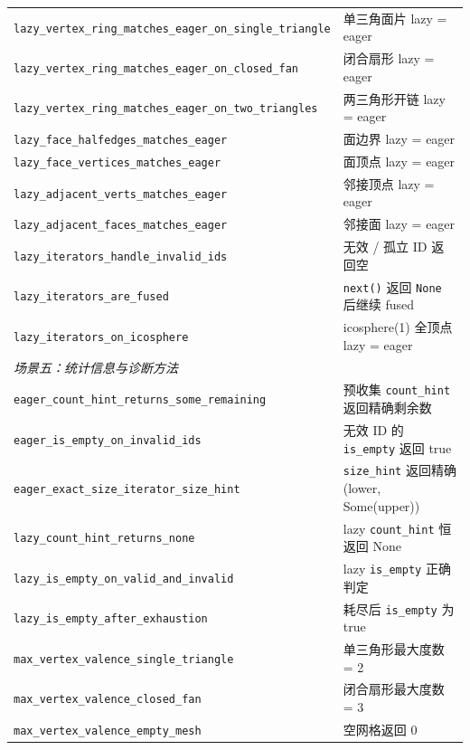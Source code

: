 \documentclass[11pt,a4paper]{article}
\begin{document}
{\begin{longtable}{@{}ll@{}}
  \texttt{lazy\_vertex\_ring\_matches\_eager\_on\_single\_triangle} & 单三角面片 lazy = eager \\
  \texttt{lazy\_vertex\_ring\_matches\_eager\_on\_closed\_fan}      & 闭合扇形 lazy = eager \\
  \texttt{lazy\_vertex\_ring\_matches\_eager\_on\_two\_triangles}   & 两三角形开链 lazy = eager \\
  \texttt{lazy\_face\_halfedges\_matches\_eager}                    & 面边界 lazy = eager \\
  \texttt{lazy\_face\_vertices\_matches\_eager}                     & 面顶点 lazy = eager \\
  \texttt{lazy\_adjacent\_verts\_matches\_eager}                    & 邻接顶点 lazy = eager \\
  \texttt{lazy\_adjacent\_faces\_matches\_eager}                    & 邻接面 lazy = eager \\
  \texttt{lazy\_iterators\_handle\_invalid\_ids}                    & 无效 / 孤立 ID 返回空 \\
  \texttt{lazy\_iterators\_are\_fused}                              & \texttt{next()} 返回 \texttt{None} 后继续 fused \\
  \texttt{lazy\_iterators\_on\_icosphere}                           & icosphere(1) 全顶点 lazy = eager \\
  \midrule
  \multicolumn{2}{l}{\textit{场景五：统计信息与诊断方法}} \\
  \texttt{eager\_count\_hint\_returns\_some\_remaining}  & 预收集 \texttt{count\_hint} 返回精确剩余数 \\
  \texttt{eager\_is\_empty\_on\_invalid\_ids}            & 无效 ID 的 \texttt{is\_empty} 返回 true \\
  \texttt{eager\_exact\_size\_iterator\_size\_hint}      & \texttt{size\_hint} 返回精确 (lower, Some(upper)) \\
  \texttt{lazy\_count\_hint\_returns\_none}              & lazy \texttt{count\_hint} 恒返回 None \\
  \texttt{lazy\_is\_empty\_on\_valid\_and\_invalid}      & lazy \texttt{is\_empty} 正确判定 \\
  \texttt{lazy\_is\_empty\_after\_exhaustion}            & 耗尽后 \texttt{is\_empty} 为 true \\
  \texttt{max\_vertex\_valence\_single\_triangle}        & 单三角形最大度数 = 2 \\
  \texttt{max\_vertex\_valence\_closed\_fan}             & 闭合扇形最大度数 = 3 \\
  \texttt{max\_vertex\_valence\_empty\_mesh}             & 空网格返回 0 \\

\end{longtable}}
\end{document}
